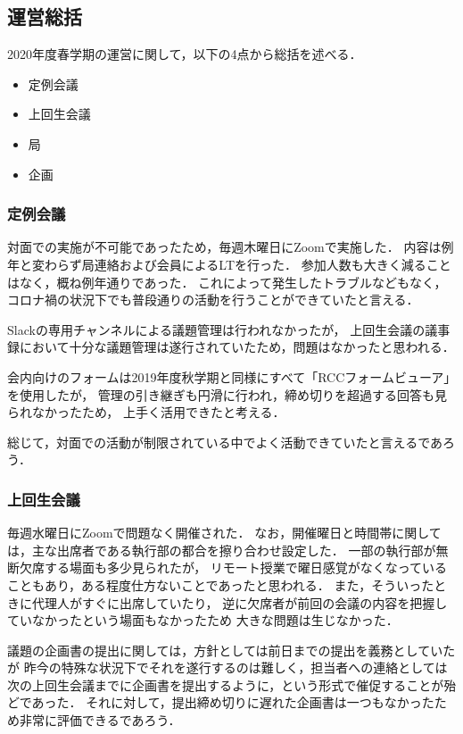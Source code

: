 \subsection*{運営総括}


2020年度春学期の運営に関して，以下の4点から総括を述べる．
\begin{itemize}
  \item 定例会議
  \item 上回生会議
  \item 局
  \item 企画
\end{itemize}

\subsubsection*{定例会議}
対面での実施が不可能であったため，毎週木曜日にZoomで実施した．
内容は例年と変わらず局連絡および会員によるLTを行った．
参加人数も大きく減ることはなく，概ね例年通りであった．
これによって発生したトラブルなどもなく，
コロナ禍の状況下でも普段通りの活動を行うことができていたと言える．

Slackの専用チャンネルによる議題管理は行われなかったが，
上回生会議の議事録において十分な議題管理は遂行されていたため，問題はなかったと思われる．

会内向けのフォームは2019年度秋学期と同様にすべて「RCCフォームビューア」を使用したが，
管理の引き継ぎも円滑に行われ，締め切りを超過する回答も見られなかったため，
上手く活用できたと考える．

総じて，対面での活動が制限されている中でよく活動できていたと言えるであろう．

\subsubsection*{上回生会議}
毎週水曜日にZoomで問題なく開催された．
なお，開催曜日と時間帯に関しては，主な出席者である執行部の都合を擦り合わせ設定した．
一部の執行部が無断欠席する場面も多少見られたが，
リモート授業で曜日感覚がなくなっていることもあり，ある程度仕方ないことであったと思われる．
また，そういったときに代理人がすぐに出席していたり，
逆に欠席者が前回の会議の内容を把握していなかったという場面もなかったため
大きな問題は生じなかった．

議題の企画書の提出に関しては，方針としては前日までの提出を義務としていたが
昨今の特殊な状況下でそれを遂行するのは難しく，担当者への連絡としては
次の上回生会議までに企画書を提出するように，という形式で催促することが殆どであった．
それに対して，提出締め切りに遅れた企画書は一つもなかったため非常に評価できるであろう．

